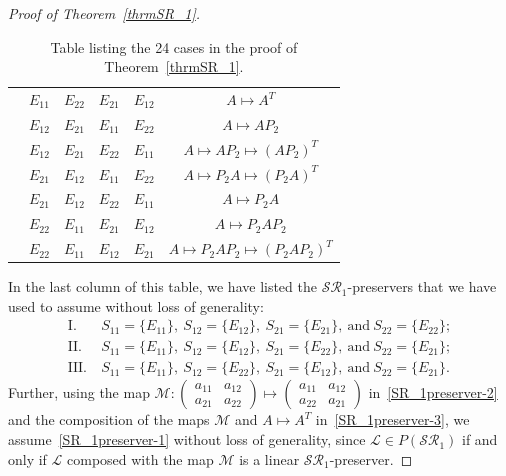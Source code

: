 \documentclass[11pt,reqno]{amsart}
\theoremstyle{plain}
\theoremstyle{definition}
\numberwithin{equation}{section}
\begin{document}
\begin{proof}[Proof of Theorem~\ref{thrmSR_1}]
\begin{table}[H]
\begin{tabular}{ ||c|c|c|c|c|c||}
			& $E_{11}$  &  $E_{22}$  &  $E_{21}$  &  $E_{12}$  & $A\mapsto A^T$  \\
			& $E_{12}$  &  $E_{21}$  &  $E_{11}$  &  $E_{22}$  & $A\mapsto AP_2$  \\
			& $E_{12}$  &  $E_{21}$  &  $E_{22}$  &  $E_{11}$  & $A\mapsto AP_2\mapsto (AP_2)^T$ \\
			& $E_{21}$  &  $E_{12}$  &  $E_{11}$  &  $E_{22}$  & $A\mapsto P_2A\mapsto (P_2A)^T$  \\
			& $E_{21}$  &  $E_{12}$  &  $E_{22}$  &  $E_{11}$  & $A\mapsto P_2A$  \\
			& $E_{22}$  &  $E_{11}$  &  $E_{21}$  &  $E_{12}$  & $A\mapsto P_2AP_2$ \\
			& $E_{22}$  &  $E_{11}$  &  $E_{12}$  &  $E_{21}$  & $A\mapsto P_2AP_2\mapsto (P_2AP_2)^T$  \\
			\hline\hline
		\end{tabular}
		
	\caption{Table listing the 24 cases in the proof of	Theorem~\ref{thrmSR_1}.}\label{Ttable}
	\end{table}
	In the last column of this table, we have listed the $\mathcal{SR}_1$-preservers that we have used to assume without loss of generality:
	\begin{align}
		\mathrm{I.} & ~ S_{11}=\{E_{11}\}, ~ S_{12}=\{E_{12}\}, ~ S_{21}=\{E_{21}\}, ~ \text{and} ~ S_{22}=\{E_{22}\};\label{SR_1preserver-1}\\
		\mathrm{II.} & ~ S_{11}=\{E_{11}\}, ~ S_{12}=\{E_{12}\}, ~ S_{21}=\{E_{22}\}, ~ \text{and} ~ S_{22}=\{E_{21}\};\label{SR_1preserver-2}\\
		\mathrm{III.} & ~ S_{11}=\{E_{11}\}, ~ S_{12}=\{E_{22}\}, ~ S_{21}=\{E_{12}\}, ~ \text{and} ~ S_{22}=\{E_{21}\}.\label{SR_1preserver-3}
	\end{align}
	Further, using the map $\mathcal{M}:\begin{pmatrix}
		a_{11} & a_{12} \\
		a_{21} & a_{22}
	\end{pmatrix}\mapsto\begin{pmatrix}
		a_{11} & a_{12} \\
		a_{22} & a_{21}
	\end{pmatrix}$ in~\eqref{SR_1preserver-2} and the composition of the maps $\mathcal{M}$ and $A\mapsto A^T$ in~\eqref{SR_1preserver-3}, we assume~\eqref{SR_1preserver-1} without loss of generality, since $\mathcal{L}\in P(\mathcal{SR}_1)$ if and only if $\mathcal{L}$ composed with the map $\mathcal{M}$ is a linear $\mathcal{SR}_1$-preserver.
	

\end{proof}
\end{document}

